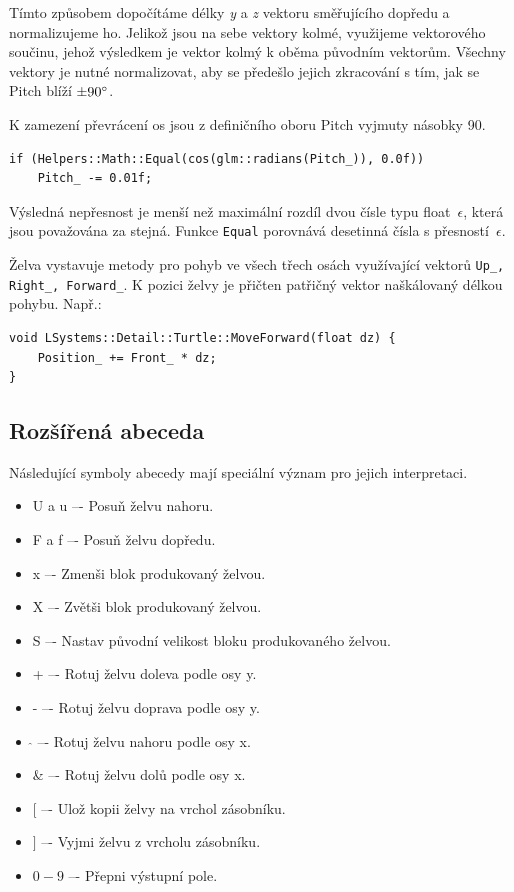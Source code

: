 \documentclass[thesis=M,czech]{FITthesis}[2019/12/23]
\begin{document}
Tímto způsobem dopočítáme délky \textit{y} a \textit{z} vektoru směřujícího dopředu a normalizujeme ho. Jelikož jsou na sebe vektory kolmé, využijeme vektorového součinu, jehož výsledkem je vektor kolmý k oběma původním vektorům. Všechny vektory je nutné normalizovat, aby se předešlo jejich zkracování s tím, jak se Pitch blíží $\pm 90\degree$.

K zamezení převrácení os jsou z definičního oboru Pitch vyjmuty násobky 90\degree.

\begin{verbatim}
if (Helpers::Math::Equal(cos(glm::radians(Pitch_)), 0.0f))
    Pitch_ -= 0.01f;
\end{verbatim}

Výsledná nepřesnost je menší než maximální rozdíl dvou čísle typu float~$\epsilon$, která jsou považována za stejná. Funkce \texttt{Equal} porovnává desetinná čísla s přesností~$\epsilon$.

Želva vystavuje metody pro pohyb ve všech třech osách využívající vektorů \texttt{Up\_, Right\_, Forward\_}. K pozici želvy je přičten patřičný vektor naškálovaný délkou pohybu. Např.:

\begin{verbatim}
void LSystems::Detail::Turtle::MoveForward(float dz) {
    Position_ += Front_ * dz;
}
\end{verbatim}

\subsection{Rozšířená abeceda}
Následující symboly abecedy mají speciální význam pro jejich interpretaci.

\begin{itemize}
\item U a u –- Posuň želvu nahoru.
\item F a f –- Posuň želvu dopředu.
\item x –- Zmenši blok produkovaný želvou.
\item X –- Zvětši blok produkovaný želvou.
\item S –- Nastav původní velikost bloku produkovaného želvou.
\item + –- Rotuj želvu doleva podle osy y.
\item - –- Rotuj želvu doprava podle osy y.
\item $\hat{}$ –- Rotuj želvu nahoru podle osy x.
\item \& –- Rotuj želvu dolů podle osy x.
\item $[$ –- Ulož kopii želvy na vrchol zásobníku.
\item $]$ –- Vyjmi želvu z vrcholu zásobníku.
\item $0-9$ –- Přepni výstupní pole.
\end{itemize}
\end{document}

